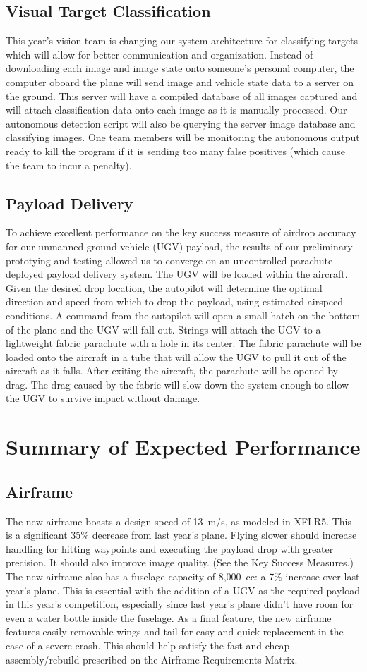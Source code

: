 \documentclass[]{auvsi_doc}
\begin{document}
\subsection{Visual Target Classification}
This year's vision team is changing our system architecture for classifying targets which will
allow for better communication and organization. Instead of downloading each image and image state
onto someone's personal computer, the computer oboard the plane will send image and vehicle state
data to a server on the ground. This server will have a compiled database of all images captured
and will attach classification data onto each image as it is manually processed. Our
autonomous detection script will also be querying the server image database and classifying
images. One team members will be monitoring the autonomous output ready to kill the
program if it is sending too many false positives (which cause the team to incur a
penalty).
\subsection{Payload Delivery}
To achieve excellent performance on the key success measure of airdrop accuracy for our unmanned ground vehicle (UGV) payload, the results of our preliminary prototying and testing allowed us to converge on an uncontrolled parachute-deployed payload delivery system. The UGV will be loaded within the aircraft. Given the desired drop location, the autopilot will determine the optimal direction and speed from which to drop the payload, using estimated airspeed conditions. A command from the autopilot will open a small hatch on the bottom of the plane and the UGV will fall out. Strings will attach the UGV to a lightweight fabric parachute with a hole in its center. The fabric parachute will be loaded onto the aircraft in a tube that will allow the UGV to pull it out of the aircraft as it falls. After exiting the aircraft, the parachute will be opened by drag. The drag caused by the fabric will slow down the system enough to allow the UGV to survive impact without damage.
\section{Summary of Expected Performance}
\subsection{Airframe}
The new airframe boasts a design speed of 13~m/s, as modeled in XFLR5. This is a significant 35\% decrease from last year's plane. Flying slower should increase handling for hitting waypoints and executing the payload drop with greater precision. It should also improve image quality. (See the Key Success Measures.) The new airframe also has a fuselage capacity of 8,000~cc: a 7\% increase over last year's plane. This is essential with the addition of a UGV as the required payload in this year's competition, especially since last year's plane didn't have room for even a water bottle inside the fuselage. As a final feature, the new airframe features easily removable wings and tail for easy and quick replacement in the case of a severe crash. This should help satisfy the fast and cheap assembly/rebuild prescribed on the Airframe Requirements Matrix.
\end{document}
